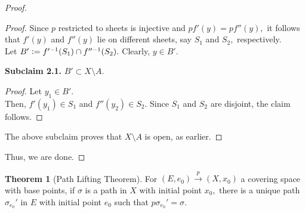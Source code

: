 \documentclass[12pt]{article}
\theoremstyle{definition}
\newtheorem{thm}{Theorem}
\numberwithin{thm}{section}
\newenvironment{blockquote}
{\begin{mdframed}[skipabove=0pt, skipbelow=0pt, innertopmargin=4pt, innerbottommargin=4pt, bottomline=false,topline=false,rightline=false, linewidth=2pt]}
{\end{mdframed}}
\begin{document}
\begin{proof}
\begin{blockquote}
\begin{proof}
			Since $p$ restricted to sheets is injective and $pf'(y) = pf''(y),$ it follows that $f'(y)$ and $f''(y)$ lie on different sheets, say $S_1$ and $S_2,$ respectively.\\
			Let $B' \vcentcolon= f'^{-1}(S_1) \cap f''^{-1}(S_2).$ Clearly, $y \in B'.$\\
			\begin{blockquote}
				\textbf{Subclaim 2.1.} $B' \subset X\setminus A.$
				\begin{proof} 
					Let $y_1 \in B'.$ \\
					Then, $f'(y_1) \in S_1$ and $f''(y_2) \in S_2.$ Since $S_1$ and $S_2$ are disjoint, the claim follows.
				\end{proof}
			\end{blockquote}
			The above subclaim proves that $X\setminus A$ is open, as earlier.
		\end{proof}
	\end{blockquote}
	Thus, we are done.
\end{proof}
\begin{thm}[Path Lifting Theorem] 
	For $(E, e_0) \overset{p}{\longrightarrow} (X, x_0)$ a covering space with base points, if $\sigma$ is a path in $X$ with initial point $x_0,$ there is a unique path $\sigma_{e_0}'$ in $E$ with initial point $e_0$ such that $p\sigma_{e_0}' = \sigma.$
\end{thm}
\end{document}

